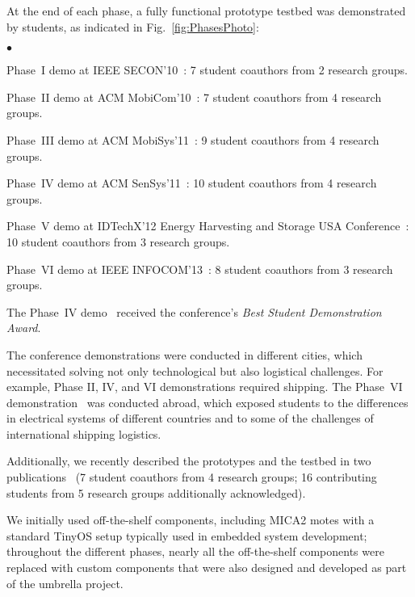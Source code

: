 \documentclass[journal,twopages]{IEEEtran}
\newcommand{\makered}[1]{\color{black}#1\color{black}}
\newenvironment{myitemize}{\begin{list}{$\bullet$}{\renewcommand{\leftmargin}{0.2in}}}{\end{list}}
\begin{document}
At the end of each phase, a fully functional prototype testbed was demonstrated by students, as indicated in Fig.~\ref{fig:PhasesPhoto}:
\begin{myitemize}
\item Phase~I demo at IEEE SECON'10~\cite{SeconDemoEnHANTs2010}: 7 student coauthors from 2 research groups.
\item Phase~II demo at ACM MobiCom'10~\cite{MobiComDemo}: 7 student coauthors from 4 research groups.
\item Phase~III demo at ACM MobiSys'11~\cite{MobiSys2011Demo}: 9 student coauthors from 4 research groups.
\item Phase~IV demo at ACM SenSys'11~\cite{SenSys2011Demo}: 10 student coauthors from 4 research groups.
\item Phase~V demo at IDTechX'12 Energy Harvesting and Storage USA Conference~\cite{IDTechDemo2012}: 10 student coauthors from 3 research groups.
\item Phase~VI demo at IEEE INFOCOM'13~\cite{Margolies2013Demo}: 8 student coauthors from 3 research groups.
\end{myitemize} The Phase~IV demo~\cite{SenSys2011Demo} received the conference's \emph{Best Student Demonstration Award}.


The conference demonstrations were conducted in different cities, which necessitated solving not only technological but also logistical challenges. For example, Phase II, IV, and VI demonstrations required shipping. The Phase~VI demonstration~\cite{Margolies2013Demo} was conducted abroad, which exposed students to the differences in electrical systems of different countries and to some of the challenges of international shipping logistics.

\makered{Additionally, we recently described the prototypes and the testbed in two publications~\cite{Gorlatova2013Prototyping,Gorlatova_EnHANTS_TOSN} (7 student coauthors from 4 research groups;
16 contributing students from 5 research groups additionally acknowledged).}


















\iffalse
We initially used off-the-shelf components, including MICA2 motes with a standard TinyOS setup typically used in embedded system development; throughout the different phases, nearly all the off-the-shelf components were replaced with custom components that were also designed and developed as part of the umbrella project.
\end{document}
